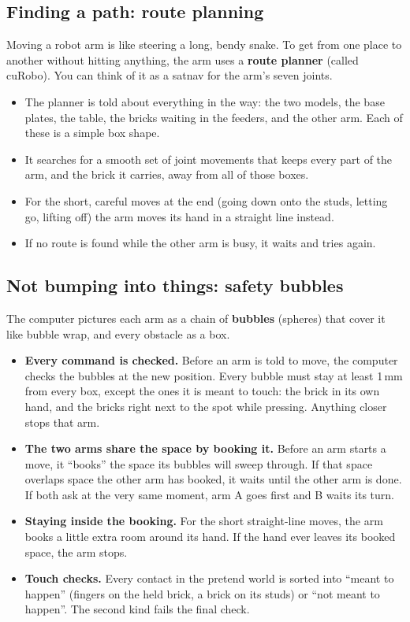 \documentclass[11pt,a4paper]{article}
\begin{document}
\subsection{Finding a path: route planning}

Moving a robot arm is like steering a long, bendy snake. To get from one place
to another without hitting anything, the arm uses a \textbf{route planner}
(called cuRobo). You can think of it as a satnav for the arm's seven joints.

\begin{itemize}
\item The planner is told about everything in the way: the two models, the base
      plates, the table, the bricks waiting in the feeders, and the other arm.
      Each of these is a simple box shape.
\item It searches for a smooth set of joint movements that keeps every part of
      the arm, and the brick it carries, away from all of those boxes.
\item For the short, careful moves at the end (going down onto the studs, letting
      go, lifting off) the arm moves its hand in a straight line instead.
\item If no route is found while the other arm is busy, it waits and tries again.
\end{itemize}

\subsection{Not bumping into things: safety bubbles}

The computer pictures each arm as a chain of \textbf{bubbles} (spheres) that
cover it like bubble wrap, and every obstacle as a box.

\begin{itemize}
\item \textbf{Every command is checked.} Before an arm is told to move, the
      computer checks the bubbles at the new position. Every bubble must stay at
      least 1\,mm from every box, except the ones it is meant to touch: the brick
      in its own hand, and the bricks right next to the spot while pressing.
      Anything closer stops that arm.
\item \textbf{The two arms share the space by booking it.} Before an arm starts
      a move, it ``books'' the space its bubbles will sweep through. If that
      space overlaps space the other arm has booked, it waits until the other
      arm is done. If both ask at the very same moment, arm A goes first and B
      waits its turn.
\item \textbf{Staying inside the booking.} For the short straight-line moves, the
      arm books a little extra room around its hand. If the hand ever leaves its
      booked space, the arm stops.
\item \textbf{Touch checks.} Every contact in the pretend world is sorted into
      ``meant to happen'' (fingers on the held brick, a brick on its studs) or
      ``not meant to happen''. The second kind fails the final check.
\end{itemize}
\end{document}
